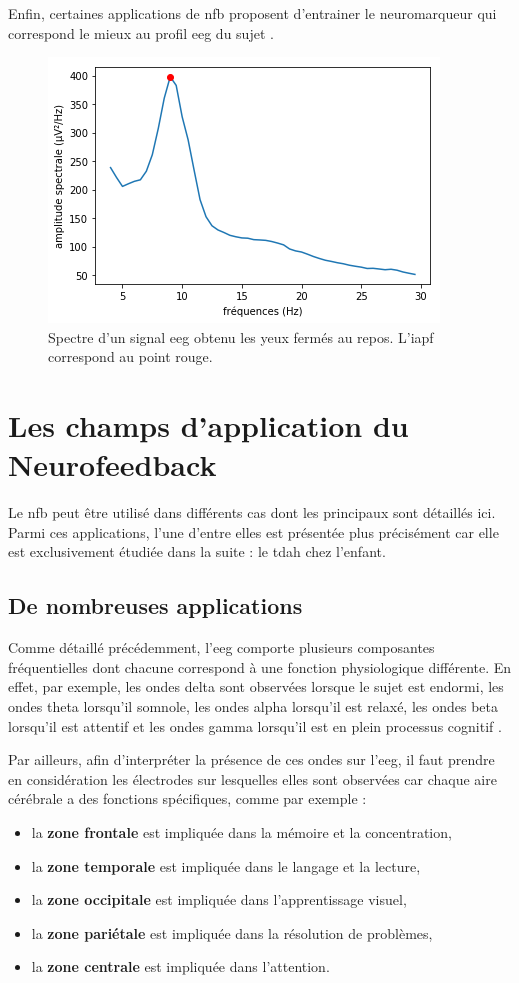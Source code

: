Enfin, certaines applications de \gls{nfb} proposent d'entrainer le neuromarqueur qui correspond le mieux au profil \gls{eeg} du sujet 
\citep{Bioulac2019, Kerson2013}. 

\begin{figure}[h!]
  \centering
	\includegraphics[width=0.5\linewidth]{figures/chapter-1/introduction-iapf} 
  \caption{Spectre d'un signal \gls{eeg} obtenu les yeux fermés au repos. L'\gls{iapf} correspond au point rouge.}
  \label{Figure:introduction_iapf}
\end{figure}

\section{Les champs d'application du Neurofeedback} \label{applications_NFB}

Le \gls{nfb} peut être utilisé dans différents cas dont les principaux sont détaillés ici. Parmi ces applications, l'une d'entre elles est présentée 
plus précisément car elle est exclusivement étudiée dans la suite : le \gls{tdah} chez l'enfant.

\subsection{De nombreuses applications}

Comme détaillé précédemment, l'\gls{eeg} comporte plusieurs composantes fréquentielles dont chacune correspond à une fonction physiologique différente.
En effet, par exemple, les ondes delta sont observées lorsque le sujet est endormi, les ondes theta lorsqu'il somnole, les ondes alpha lorsqu'il est relaxé, 
les ondes beta lorsqu'il est attentif et les ondes gamma lorsqu'il est en plein processus cognitif \citep{Marzbani2016}. 

Par ailleurs, afin d'interpréter la présence de ces ondes sur l'\gls{eeg}, il faut prendre en considération les électrodes sur lesquelles elles sont observées 
car chaque aire cérébrale a des fonctions spécifiques, comme par exemple \citep{Marzbani2016} :
\begin{itemize}
\item la \textbf{zone frontale} est impliquée dans la mémoire et la concentration,
\item la \textbf{zone temporale} est impliquée dans le langage et la lecture,
\item la \textbf{zone occipitale} est impliquée dans l'apprentissage visuel,
\item la \textbf{zone pariétale} est impliquée dans la résolution de problèmes,
\item la \textbf{zone centrale} est impliquée dans l'attention.
\end{itemize}

